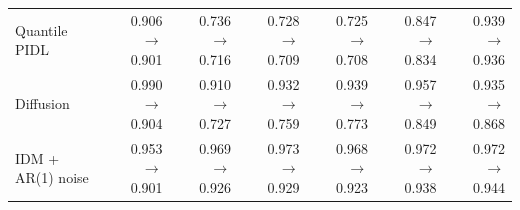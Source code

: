 \begin{table}[htbp]
\begin{tabular}{lrrrrrr}
Quantile PIDL & 0.906 $\rightarrow$ 0.901 & 0.736 $\rightarrow$ 0.716 & 0.728 $\rightarrow$ 0.709 & 0.725 $\rightarrow$ 0.708 & 0.847 $\rightarrow$ 0.834 & 0.939 $\rightarrow$ 0.936 \\
Diffusion & 0.990 $\rightarrow$ 0.904 & 0.910 $\rightarrow$ 0.727 & 0.932 $\rightarrow$ 0.759 & 0.939 $\rightarrow$ 0.773 & 0.957 $\rightarrow$ 0.849 & 0.935 $\rightarrow$ 0.868 \\
IDM + AR(1) noise & 0.953 $\rightarrow$ 0.901 & 0.969 $\rightarrow$ 0.926 & 0.973 $\rightarrow$ 0.929 & 0.968 $\rightarrow$ 0.923 & 0.972 $\rightarrow$ 0.938 & 0.972 $\rightarrow$ 0.944 \\
\bottomrule
\end{tabular}
\end{table}
